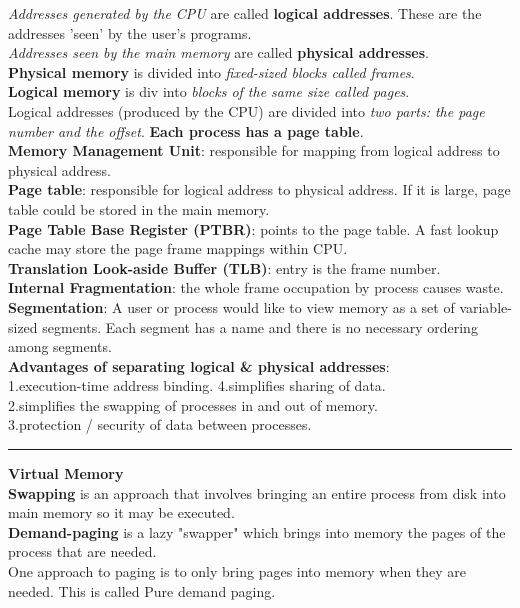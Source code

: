 \documentclass[8pt,a4paper,landscape]{article}
\newcommand{\topic}[1]{\textbf{\large #1}}
\begin{document}
\begin{spacing}{-1}
\begin{multicols*}{3}
\textit{Addresses generated by the CPU} are called \textbf{logical addresses}. 
These are the addresses 'seen' by the user's programs.\\
\textit{Addresses seen by the main memory} are called \textbf{physical addresses}. \\
\textbf{Physical memory} is divided into \textit{fixed-sized blocks called frames}. \\
\textbf{Logical memory} is div into \textit{blocks of the same size called pages}. \\
Logical addresses (produced by the CPU) are divided into \textit{two parts: the page number and the offset}. 
\textbf{Each process has a page table}. \\
\textbf{Memory Management Unit}: responsible for mapping from logical address to physical address. \\
\textbf{Page table}: responsible for logical address to physical address. If it is large, page table could be
stored in the main memory. \\
\textbf{Page Table Base Register (PTBR)}: points to the page table. A fast lookup cache may store the page frame mappings within CPU. \\
\textbf{Translation Look-aside Buffer (TLB)}: entry is the frame number. \\
\textbf{Internal Fragmentation}: the whole frame occupation by process causes waste. \\
\textbf{Segmentation}: A user or process would like to view memory as a set of variable-sized segments. Each segment has a name and there is no necessary ordering among segments. \\
\textbf{Advantages of separating logical \& physical addresses}: \\
1.execution-time address binding.  4.simplifies sharing of data. \\
2.simplifies the swapping of processes in and out of memory. \\
3.protection / security of data between processes.
\hrule \noindent
\topic{Virtual Memory} \\
\textbf{Swapping} is an approach that involves bringing an entire process from disk into main memory so it may be executed. \\
\textbf{Demand-paging} is a lazy "swapper" which brings into memory the pages of the process that are needed. \\
One approach to paging is to only bring pages into memory when they are needed. This is called Pure demand paging. \\

\end{multicols*}
\end{spacing}
\end{document}
